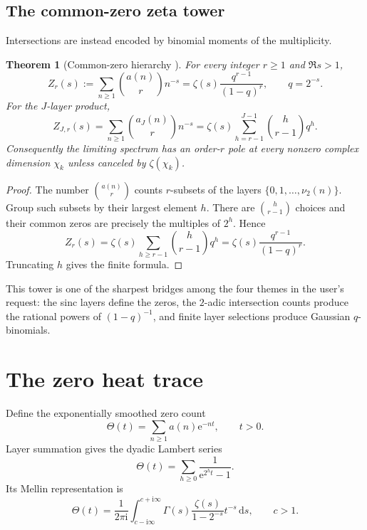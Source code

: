 \documentclass[11pt]{article}
\numberwithin{equation}{section}
\newtheorem{theorem}{Theorem}[section]
\theoremstyle{definition}
\theoremstyle{remark}
\newcommand{\dd}{\,\mathrm d}
\newcommand{\e}{\mathrm e}
\newcommand{\ii}{\mathrm i}
\begin{document}
\subsection{The common-zero zeta tower}

Intersections are instead encoded by binomial moments of the multiplicity.

\begin{theorem}[Common-zero hierarchy \NewResult]
\label{p2:thm:common-zero}
For every integer $r\ge1$ and $\Re s>1$,
\begin{equation}
 Z_r(s):=\sum_{n\ge1}\binom{a(n)}r n^{-s}
 =\zeta(s)\frac{q^{r-1}}{(1-q)^r},\qquad q=2^{-s}.         \label{p2:eq:Zr}
\end{equation}
For the $J$-layer product,
\begin{equation}
 Z_{J,r}(s)=\sum_{n\ge1}\binom{a_J(n)}r n^{-s}
 =\zeta(s)\sum_{h=r-1}^{J-1}\binom{h}{r-1}q^h.           \label{p2:eq:ZJr}
\end{equation}
Consequently the limiting spectrum has an order-$r$ pole at every nonzero
complex dimension $\chi_k$ unless canceled by $\zeta(\chi_k)$.
\end{theorem}

\begin{proof}
The number $\binom{a(n)}r$ counts $r$-subsets of the layers
$\{0,1,\ldots,\nu_2(n)\}$.  Group such subsets by their largest element $h$.
There are $\binom{h}{r-1}$ choices and their common zeros are precisely the
multiples of $2^h$.  Hence
\[
 Z_r(s)=\zeta(s)\sum_{h\ge r-1}\binom{h}{r-1}q^h
 =\zeta(s)\frac{q^{r-1}}{(1-q)^r}.
\]
Truncating $h$ gives the finite formula.
\end{proof}

This tower is one of the sharpest bridges among the four themes in the user's
request: the sinc layers define the zeros, the $2$-adic intersection counts
produce the rational powers of $(1-q)^{-1}$, and finite layer selections produce
Gaussian $q$-binomials.

\section{The zero heat trace}
\label{p2:sec:heat}

Define the exponentially smoothed zero count
\begin{equation}
 \Theta(t)=\sum_{n\ge1}a(n)\e^{-nt},\qquad t>0.            \label{p2:eq:Theta}
\end{equation}
Layer summation gives the dyadic Lambert series
\begin{equation}
 \Theta(t)=\sum_{h\ge0}\frac1{\e^{2^ht}-1}.               \label{p2:eq:Theta-Lambert}
\end{equation}
Its Mellin representation is
\begin{equation}
 \Theta(t)=\frac1{2\pi\ii}\int_{c-\ii\infty}^{c+\ii\infty}
 \Gamma(s)\frac{\zeta(s)}{1-2^{-s}}t^{-s}\dd s,
 \qquad c>1.                                               \label{p2:eq:Theta-Mellin}
\end{equation}
\end{document}
